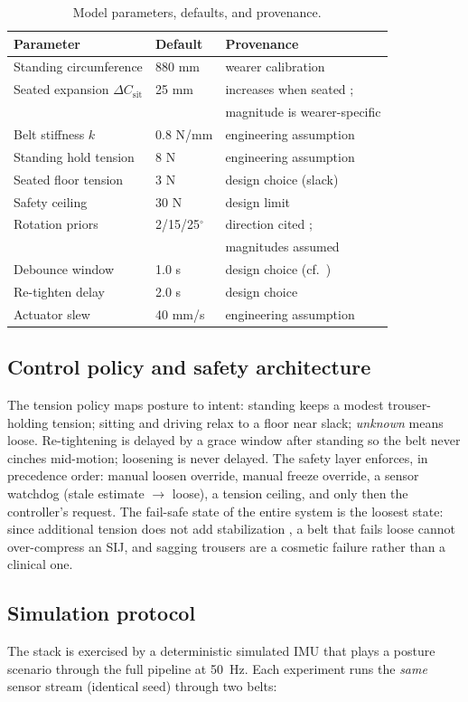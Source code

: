 \documentclass[11pt]{article}
\begin{document}
\begin{table}[t]
\centering
\caption{Model parameters, defaults, and provenance.}
\label{tab:assumptions}
\begin{tabular}{lll}
\toprule
Parameter & Default & Provenance \\
\midrule
Standing circumference & 880 mm & wearer calibration \\
Seated expansion $\Delta C_{\text{sit}}$ & 25 mm & increases when seated \cite{ref11}; \\
 & & magnitude is wearer-specific \\
Belt stiffness $k$ & 0.8 N/mm & engineering assumption \\
Standing hold tension & 8 N & engineering assumption \\
Seated floor tension & 3 N & design choice (slack) \\
Safety ceiling & 30 N & design limit \\
Rotation priors & 2/15/25$^\circ$ & direction cited \cite{ref24}; \\
 & & magnitudes assumed \\
Debounce window & 1.0 s & design choice (cf.\ \cite{ref23}) \\
Re-tighten delay & 2.0 s & design choice \\
Actuator slew & 40 mm/s & engineering assumption \\
\bottomrule
\end{tabular}
\end{table}

\subsection{Control policy and safety architecture}
The tension policy maps posture to intent: standing keeps a modest
trouser-holding tension; sitting and driving relax to a floor near
slack; \emph{unknown} means loose. Re-tightening is delayed by a grace
window after standing so the belt never cinches mid-motion; loosening
is never delayed. The safety layer enforces, in precedence order:
manual loosen override, manual freeze override, a sensor watchdog
(stale estimate $\rightarrow$ loose), a tension ceiling, and only then
the controller's request. The fail-safe state of the entire system is
the loosest state: since additional tension does not add stabilization
\cite{ref4}, a belt that fails loose cannot over-compress an SIJ, and
sagging trousers are a cosmetic failure rather than a clinical one.

\subsection{Simulation protocol}
The stack is exercised by a deterministic simulated IMU that plays a
posture scenario through the full pipeline at 50~Hz. Each experiment
runs the \emph{same} sensor stream (identical seed) through two belts:
\end{document}
